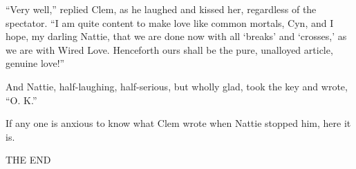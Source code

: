 ``Very well,'' replied Clem, as he laughed and kissed her, regardless of
the spectator. ``I am quite content to make love like common mortals,
Cyn, and I hope, my darling Nattie, that we are done now with all
`breaks' and `crosses,' as we are with Wired Love. Henceforth ours shall
be the pure, unalloyed article, genuine love!''

And Nattie, half-laughing, half-serious, but wholly glad, took the key
and wrote, ``O. K.''

If any one is anxious to know what Clem wrote when Nattie stopped him,
here it is.

\begin{center}
\mdash\mintra\mdash\minter\mdash\mintra\mdot\mintra\mdash\mintra\mdash\mword\mdot\mintra\mdash\mintra\mdot\mintra\mdot\minter\mdot\mintra\mdot\minter\mdash\minter\mdash\minter\mdot\mintra\mdash\mintra\mdot\mintra\mdot\minter\mdot

\mdash\mintra\mdot\mintra\mdot\minter\mdot\mintra\mdash\minter\mdot\mintra\mdash\mintra\mdot\minter\mdot\mintra\mdash\mintra\mdot\mintra\mdot\minter\mdot\mintra\mdot\minter\mdash\mintra\mdot\minter\mdash\mintra\mdash\mintra\mdot

\mdash\mintra\mdash\minter\mdash\mintra\mdot\mintra\mdash\mintra\mdash\mword\mdot\mintra\mdash\mintra\mdash\minter\mdot\mintra\mdot\minter\mdot\mintra\mdot\mintra\mdash\mintra\mdot\minter\mdot
\end{center}
\begin{center}
THE END
\end{center}

\clearpage
\markboth{}{}
\cleardoublepage


